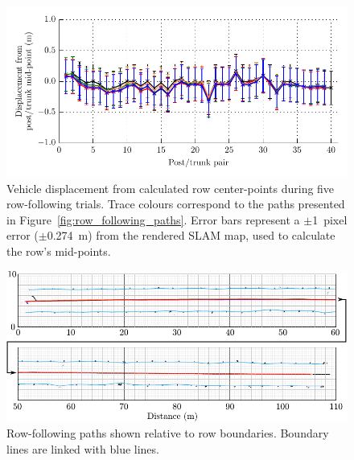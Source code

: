 \documentclass[preprint,authoryear,12pt]{elsarticle}
\begin{document}
    \begin{figure}[htb]
        \centering
        \includegraphics{imgs/slam/row_tracking_averages.pdf}
        \caption{
            Vehicle displacement from calculated row center-points during five row-following trials.
            Trace colours correspond to the paths presented in Figure~\ref{fig:row_following_paths}.
            Error bars represent a $\pm$\SI{1}{pixel} error ($\pm$\SI{0.274}{\meter}) from the rendered SLAM map, used to calculate the row's mid-points.
        }
        \label{fig:row_following_performance_analysis}
    \end{figure}

    \begin{figure}[htb]
        \centering
        \includegraphics[width=\linewidth]{imgs/slam/row_tracking_segmented.pdf}
        \caption{
            Row-following paths shown relative to row boundaries.
            Boundary lines are linked with blue lines.
        }
        \label{fig:row_following_paths_segmented}
    \end{figure}
\end{document}
